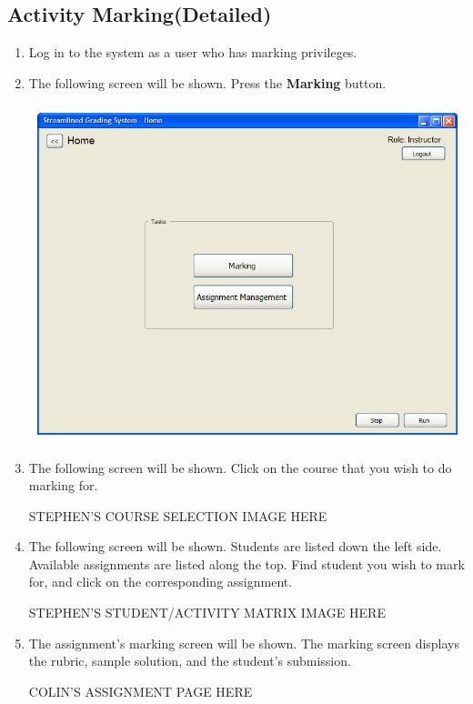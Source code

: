 \documentclass{article}
\begin{document}
\subsection{Activity Marking(Detailed)}
\begin{enumerate}
  \item Log in to the system as a user who has marking privileges.
  \item The following screen will be shown.  Press the \textbf{Marking} button.
  \begin{center} 
   \includegraphics[scale=0.6]{../images/UIMockups/PNG_Renders/LandingPage}
  \end{center}
  \item The following screen will be shown.  Click on the course that you wish to do marking for.
    \begin{center} 
   STEPHEN'S COURSE SELECTION IMAGE HERE
    \end{center}
  \item The following screen will be shown.  Students are listed down the left side.  Available assignments are listed along the top.  Find student you wish to mark for, and click on the corresponding assignment.
  \begin{center} 
   STEPHEN'S STUDENT/ACTIVITY MATRIX IMAGE HERE
    \end{center}
  \item The assignment's marking screen will be shown.  The marking screen displays the rubric, sample solution, and the student's submission. 
  \begin{center} 
   COLIN'S ASSIGNMENT PAGE HERE

\end{center}
\end{enumerate}
\end{document}
